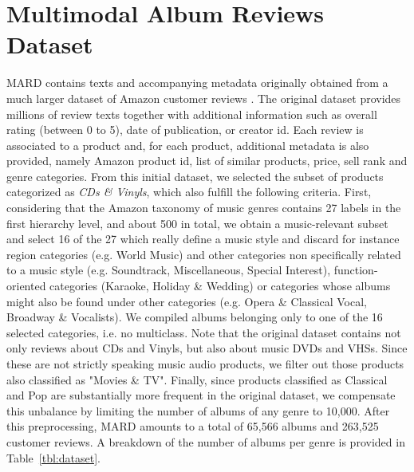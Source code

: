 

\section{Multimodal Album Reviews Dataset}\label{sec:dataset}

MARD contains texts and accompanying metadata originally obtained from a much larger dataset of Amazon customer reviews \cite{McAuley2015a,McAuley2015}. The original dataset provides millions of review texts together with additional information such as overall rating (between 0 to 5), date of publication, or creator id. Each review is associated to a product and, for each product, additional metadata is also provided, namely Amazon product id, list of similar products, price, sell rank and genre categories. From this initial dataset, we selected the subset of products categorized as \textit{CDs \& Vinyls}, which also fulfill the following criteria. First, considering that the Amazon taxonomy of music genres contains 27 labels in the first hierarchy level, and about 500 in total, we obtain a music-relevant subset and select 16 of the 27 which really define a music style and discard for instance region categories (e.g. World Music) and other categories non specifically related to a music style (e.g. Soundtrack, Miscellaneous, Special Interest), function-oriented categories (Karaoke, Holiday \& Wedding) or categories whose albums might also be found under other categories (e.g. Opera \& Classical Vocal, Broadway \& Vocalists). We compiled albums belonging only to one of the 16 selected categories, i.e. no multiclass. Note that the original dataset contains not only reviews about CDs and Vinyls, but also about music DVDs and VHSs. Since these are not strictly speaking music audio products, we filter out those products also classified as "Movies \& TV". Finally, since products classified as Classical and Pop are substantially more frequent in the original dataset, we compensate this unbalance by limiting the number of albums of any genre to 10,000. After this preprocessing, MARD amounts to a total of 65,566 albums and 263,525 customer reviews. A breakdown of the number of albums per genre is provided in Table~\ref{tbl:dataset}.

